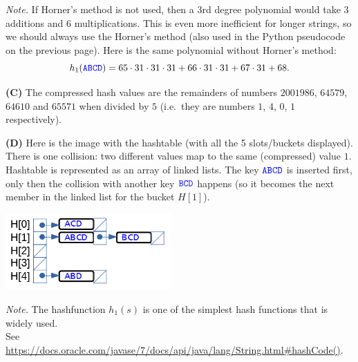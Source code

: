 \documentclass[a4paper,12pt]{article}
\begin{document}
{\em Note.} If Horner's method is not used, then a 3rd degree polynomial would take $3$ additions
and $6$ multiplications. This is even more inefficient for longer strings, so we should always
use the Horner's method (also used in the Python pseudocode on the previous page). 
Here is the same polynomial without Horner's method:
$$h_1(\textcolor{blue}{\mathtt{ABCD}}) = 65 \cdot 31 \cdot 31 \cdot 31 + 66 \cdot 31 \cdot 31 + 67 \cdot 31 + 68.$$ 

\vspace{10pt}
{\bf (C)} The compressed hash values are the remainders of numbers $2001986$, 
$64579$, $64610$ and $65571$ when divided by $5$ (i.e.\ they are numbers $1$, $4$, $0$, $1$ respectively). 

\vspace{10pt}
{\bf (D)} Here is the image with the hashtable (with all the 5 slots/buckets displayed). There
is one collision: two different values map to the same (compressed) value $1$. 
Hashtable is represented as an array of linked lists. 
The key $\textcolor{blue}{\mathtt{ABCD}}$ is inserted first, only then the collision with 
another key $\textcolor{blue}{\mathtt{BCD}}$ happens (so it becomes the next member in the linked list
for the bucket $H[1]$). 


\includegraphics[width=2.5in]{assignment07-hashtables/5slot-hashtable.png}

\vspace{30pt}
{\em Note.} The hashfunction $h_1(s)$ is one of the simplest hash functions that is widely used.\\
See \url{https://docs.oracle.com/javase/7/docs/api/java/lang/String.html#hashCode()}. 
\end{document}

